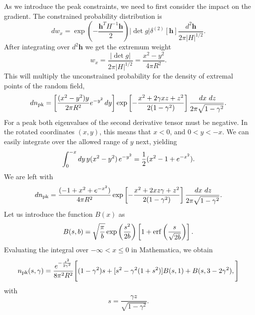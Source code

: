 \documentclass[twocolumn]{emulateapj}
\newcommand{\hh}{\mathbf{h}}
\begin{document}
As we introduce the peak constraints, we need to first consider the impact
on the gradient. The constrained probability distribution
is
\begin{equation}
	dw_x = \exp\left(-\frac{\hh^T H^{-1} \hh}{2}\right) 
			|\det g| \delta^{(2)}[\hh]			
			\frac{d^2 \hh} {2\pi|H|^{1/2}}.
\end{equation}
After integrating over $d^2\hh$ we get the extremum weight
\begin{equation}
	w_x = \frac{|\det g|}{2\pi|H|^{1/2}} =\frac{x^2-y^2}{4 \pi R^2}.
\end{equation}
This will multiply the unconstrained probability for the density of extremal 
points of the random field, 
\begin{equation}
		dn_{\rm{}pk}=\left[\frac{(x^2-y^2)y}{2\pi R^2} e^{-y^2}\,dy\right]
		\exp\left[-\frac{x^2 + 2\gamma x z + z^2}{2(1-\gamma^2)}\right] 
			\frac{\,dx\ dz}{2\pi \sqrt{1-\gamma^2}}.
\end{equation}
For a peak both eigenvalues of the second derivative tensor must be negative. 
In the rotated coordinates $(x,y)$, this means that $x<0$, and $0<y<-x$.
We can easily integrate over the allowed range of $y$ next, yielding
\begin{equation}
	\int_0^{-x} dy\, y\/ (x^2-y^2)\, e^{-y^2} 
		=\frac{1}{2}(x^2-1+e^{-x^2}).
\end{equation}
We are left with
\begin{equation}
	dn_{\rm{}pk} = \frac{(-1 + x^2 +e^{-x^2})}{4\pi R^2}  
	\exp\left[-\frac{x^2 + 2 x z \gamma + z^2 }{2 (1-\gamma^2)}\right]
	\frac{\,dx\ dz}{2\pi \sqrt{1-\gamma^2}}.
\end{equation}
Let us introduce the function $B(x)$ as
\begin{equation}
	B(s,b) = \sqrt{\frac{\pi}{b}} \exp\left({\frac{s^2}{2b}}\right)
	\left[1+ {\rm erf}\left( \frac{s}{\sqrt{2b}}\right)\right].
\end{equation}
Evaluating the integral over $-\infty<x\leq 0$ in Mathematica, we obtain
\begin{equation}
 n_{\rm{}pk}(s,\gamma)= 
		\frac{e^{-\frac{s^2}{2\gamma^2}}}{8\pi^2R^2}
		\Bigg[
			(1-\gamma^2)s +[s^2 - \gamma^2 (1 + s^2)] B(s,1)
			+B(s, 3- 2\gamma^2),
		\Bigg]
\end{equation}
with
\begin{equation}
	s = \frac{\gamma z}{\sqrt{1-\gamma^2}}.
\end{equation}
\end{document}
